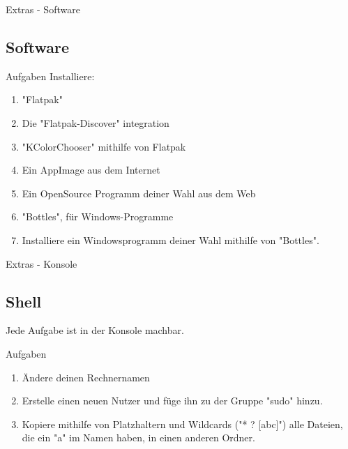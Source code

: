 \begin{frame}{Extras - Software}
    \subsection{Software}\label{subsec:software}

    \begin{alertblock}{Aufgaben}
        Installiere:
        \begin{enumerate}
            \item "Flatpak"
            \item Die "Flatpak-Discover" integration
            \item "KColorChooser" mithilfe von Flatpak
            \item Ein AppImage aus dem Internet
            \item Ein OpenSource Programm deiner Wahl aus dem Web
            \item "Bottles", für Windows-Programme
            \item Installiere ein Windowsprogramm deiner Wahl mithilfe von "Bottles".
        \end{enumerate}

    \end{alertblock}

\end{frame}


\begin{frame}{Extras - Konsole}
    \subsection{Shell}\label{subsec:shell}

    Jede Aufgabe ist in der Konsole machbar.

    \vspace{0.5cm}
    \begin{alertblock}{Aufgaben}
        \begin{enumerate}
            \item Ändere deinen Rechnernamen
            \item Erstelle einen neuen Nutzer und füge ihn zu der Gruppe "sudo" hinzu.
            \item Kopiere mithilfe von Platzhaltern und Wildcards ("* ? [abc]") alle Dateien, die ein "a" im Namen haben, in einen anderen Ordner.
        \end{enumerate}
    \end{alertblock}

\end{frame}


